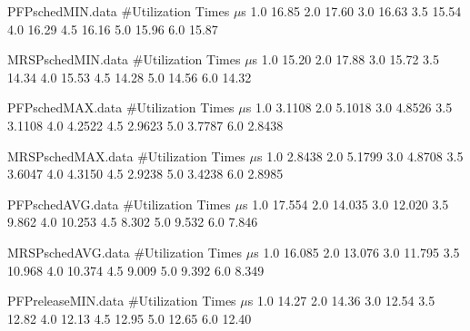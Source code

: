\begin{filecontents}{PFPschedMIN.data}
#Utilization   Times $\mu$s
1.0  16.85
2.0  17.60
3.0  16.63
3.5  15.54
4.0  16.29
4.5  16.16
5.0  15.96
6.0  15.87
\end{filecontents}

\begin{filecontents}{MRSPschedMIN.data}
#Utilization   Times $\mu$s
1.0  15.20
2.0  17.88
3.0  15.72
3.5  14.34
4.0  15.53
4.5  14.28
5.0  14.56
6.0  14.32
\end{filecontents}

\begin{filecontents}{PFPschedMAX.data}
#Utilization   Times $\mu$s
1.0  3.1108
2.0  5.1018
3.0  4.8526
3.5  3.1108
4.0  4.2522
4.5  2.9623
5.0  3.7787
6.0  2.8438
\end{filecontents}

\begin{filecontents}{MRSPschedMAX.data}
#Utilization   Times $\mu$s
1.0  2.8438
2.0  5.1799
3.0  4.8708
3.5  3.6047
4.0  4.3150
4.5  2.9238
5.0  3.4238
6.0  2.8985
\end{filecontents}

\begin{filecontents}{PFPschedAVG.data}
#Utilization   Times $\mu$s
1.0  17.554
2.0  14.035
3.0  12.020
3.5  9.862
4.0  10.253
4.5  8.302
5.0  9.532
6.0  7.846
\end{filecontents}

\begin{filecontents}{MRSPschedAVG.data}
#Utilization   Times $\mu$s
1.0  16.085
2.0  13.076
3.0  11.795
3.5  10.968
4.0  10.374
4.5  9.009
5.0  9.392
6.0  8.349
\end{filecontents}


\begin{filecontents}{PFPreleaseMIN.data}
#Utilization   Times $\mu$s
1.0  14.27
2.0  14.36
3.0  12.54
3.5  12.82
4.0  12.13
4.5  12.95
5.0  12.65
6.0  12.40
\end{filecontents}


